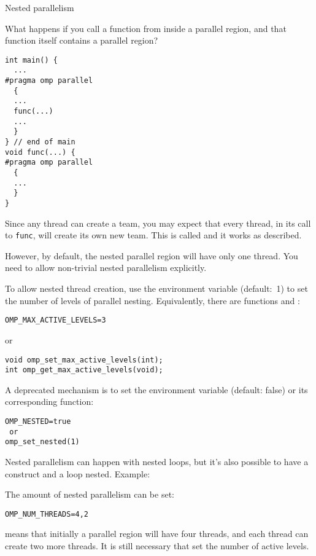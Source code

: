  {Nested parallelism}
\label{sec:omp-levels}

What happens if you call a function from inside a parallel region, and
that function itself contains a parallel region?
\begin{lstlisting}
int main() {
  ...
#pragma omp parallel
  {
  ...
  func(...)
  ...
  }
} // end of main
void func(...) {
#pragma omp parallel
  {
  ...
  }
}
\end{lstlisting}

Since any thread can create a team, you may expect that every thread,
in its call to \lstinline{func},
will create its own new team.
This is called 
and it works as described.

However, by default, the nested parallel region will have only one thread.
You need to allow non-trivial nested parallelism explicitly.

To allow nested thread creation,
use the environment variable
 (default:~1)
to set the number of levels of parallel nesting.
Equivalently, there are functions
 and :
\begin{verbatim}
OMP_MAX_ACTIVE_LEVELS=3
\end{verbatim}
or
\begin{lstlisting}
void omp_set_max_active_levels(int);
int omp_get_max_active_levels(void);
\end{lstlisting}

\begin{remark}
  A deprecated mechanism is to set the environment variable
   (default: false)
  or its corresponding function:
\begin{verbatim}
OMP_NESTED=true
 or
omp_set_nested(1)
\end{verbatim}
\end{remark}

Nested parallelism can happen with nested loops,
but it's also possible to have a  construct
and a loop nested.
Example:

The amount of nested parallelism can be set:
\begin{verbatim}
OMP_NUM_THREADS=4,2
\end{verbatim}
means that initially a parallel region will have four threads, and
each thread can create two more threads.
It is still necessary that set the number of active levels.

